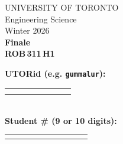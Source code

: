 \documentclass[12pt]{article}
\begin{document}
\newcommand{\spacer}{
  \vspace{5mm}\\
}

\newcommand{\hspacer}{\\
}

\noindent
\begin{minipage}{0.45\textwidth}
\large
\noindent  UNIVERSITY OF TORONTO\\
  Engineering Science\\[1.75ex]
  Winter 2026\\[1.75ex]
  \textbf{Finale} \\
  \textbf{{ROB\,311\,H1}}
\end{minipage}%
\hspace{-1cm}
\begin{minipage}{0.6\textwidth}
\raggedleft
\textbf{UTORid (e.g. \texttt{gummalur}):} \\[1ex]
\begin{tabular}{|c|c|c|c|c|c|c|c|}
  \hline
  \hspace{1.2em}\; & \hspace{1.2em}\; & \hspace{1.2em}\; & \hspace{1.2em}\; & \hspace{1.2em}\; & \hspace{1.2em}\; & \hspace{1.2em}\; & \hspace{1.2em}\; \\
  \hspace{1.2em}\; & \hspace{1.2em}\; & \hspace{1.2em}\; & \hspace{1.2em}\; & \hspace{1.2em}\; & \hspace{1.2em}\; & \hspace{1.2em}\; & \hspace{1.2em}\;\\
  \hline
\end{tabular}\\[2ex]
\textbf{Student \# (9 or 10 digits):} \\[1ex]
\begin{tabular}{|c|c|c|c|c|c|c|c|c|c|}
  \hline
  \hspace{1.2em}\; & \hspace{1.2em}\; & \hspace{1.2em}\; & \hspace{1.2em}\; & \hspace{1.2em}\; & \hspace{1.2em}\; & \hspace{1.2em}\; & \hspace{1.2em}\; & \hspace{1.2em}\; & \hspace{1.2em}\; \\

\end{tabular}
\end{minipage}
\end{document}

